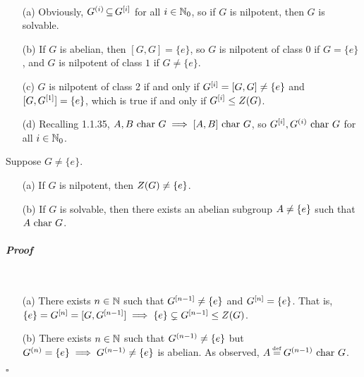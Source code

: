 \documentclass[11pt]{book}
\theoremstyle{definition}   \newtheorem{defn}[counter]{Definition} %
\newcommand\myeq{\mathrel{\overset{\makebox[0pt]{\mbox{\normalfont\tiny\sffamily \textrm{def}}}}{=}}}
\newenvironment{prf}{\paragraph{\textit{Proof}}}{\hfill$\square$}
\newcommand{\vs}{\vspace{8pt}}
\numberwithin{counter}{chapter}
\begin{document}
\vs

\begin{remark}\
\begin{enumerate}
\item[(a)] Obviously, $G^{(i)} \operatorname{\subseteq} G^{[i]}$ for all $i \in \operatorname{\mathbb{N}}_0$, so if $G$ is nilpotent, then $G$ is solvable.
\item[(b)] If $G$ is abelian, then $[G,G] = \{e\}$, so $G$ is nilpotent of class $0$ if $G=\{e\}$, and $G$ is nilpotent of class $1$ if $G \ne \{e\}$.
\item[(c)] $G$ is nilpotent of class 2 if and only if $G^{[i]} = [G,G] \ne \{e\}$ and $[G, G^{[1]}] = \{e\}$, which is true if and only if $G^{[i]} \leq Z(G)$.
\item[(d)] Recalling 1.1.35, $A,B \textnormal{ char } G \implies [A,B] \textnormal{ char } G$, so $G^{[i]}, G^{(i)} \textnormal{ char } G$ for all $i \in \operatorname{\mathbb{N}}_0$.
\end{enumerate}
\end{remark}

\vs

\begin{lemma}
Suppose $G \ne \{e\}$.
\begin{enumerate}
\item[(a)] If $G$ is nilpotent, then $Z(G) \ne \{e\}$.
\item[(b)] If $G$ is solvable, then there exists an abelian subgroup $A \ne \{e\}$ such that $A \textnormal{ char } G$.
\end{enumerate}
\end{lemma}

\begin{prf}\
\begin{enumerate}
\item[(a)] There exists $n \in \operatorname{\mathbb{N}}$ such that $G^{[n-1]} \ne \{e\}$ and $G^{[n]} = \{e\}$. That is, $\{e\} = G^{[n]} = [G,G^{[n-1]}] \implies \{e\} \subsetneq G^{[n-1]} \leq Z(G)$.
\item[(b)] There exists $n \in \operatorname{\mathbb{N}}$ such that $G^{(n-1)} \ne \{e\}$ but $G^{(n)} = \{e\} \implies G^{(n-1)} \ne \{e\}$ is abelian. As observed, $A \myeq \ds{G}{n-1} \car G$.
\end{enumerate}
\end{prf}

\vs
\end{document}
